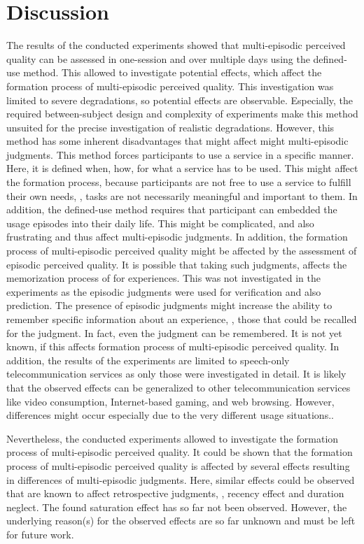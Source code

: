 \section{Discussion}
The results of the conducted experiments showed that multi-episodic perceived quality can be assessed in one-session and over multiple days using the defined-use method.
This allowed to investigate potential effects, which affect the formation process of multi-episodic perceived quality.
This investigation was limited to severe degradations, so potential effects are observable.
Especially, the required between-subject design and complexity of experiments make this method unsuited for the precise investigation of realistic degradations.
However, this method has some inherent disadvantages that might affect might multi-episodic judgments.
This method forces participants to use a service in a specific manner.
Here, it is defined when, how, for what a service has to be used.
This might affect the formation process, because participants are not free to use a service to fulfill their own needs, \ie, tasks are not necessarily meaningful and important to them.
In addition, the defined-use method requires that participant can embedded the usage episodes into their daily life.
This might be complicated, and also frustrating and thus affect multi-episodic judgments.
In addition, the formation process of multi-episodic perceived quality might be affected by the assessment of episodic perceived quality.
It is possible that taking such judgments, affects the memorization process of for experiences.
This was not investigated in the experiments as the episodic judgments were used for verification and also prediction.
The presence of episodic judgments might increase the ability to remember specific information about an experience, \ie, those that could be recalled for the judgment.
In fact, even the judgment can be remembered.
It is not yet known, if this affects formation process of multi-episodic perceived quality.
In addition, the results of the experiments are limited to speech-only telecommunication services as only those were investigated in detail.
It is likely that the observed effects can be generalized to other telecommunication services like video consumption, Internet-based gaming, and web browsing.
However, differences might occur especially due to the very different usage situations..

Nevertheless, the conducted experiments allowed to investigate the formation process of multi-episodic perceived quality.
It could be shown that the formation process of multi-episodic perceived quality is affected by several effects resulting in differences of multi-episodic judgments.
Here, similar effects could be observed that are known to affect retrospective judgments, \ie, recency effect and duration neglect.
The found saturation effect has so far not been observed.
However, the underlying reason(s) for the observed effects are so far unknown and must be left for future work.

